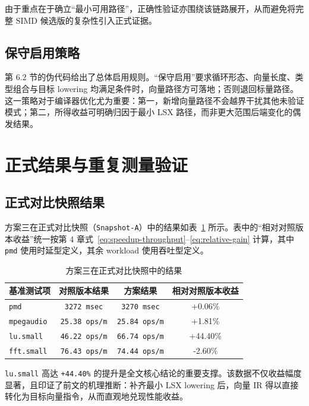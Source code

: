 由于重点在于确立“最小可用路径”，正确性验证亦围绕该链路展开，从而避免将完整 SIMD 候选版的复杂性引入正式证据。

\subsection{保守启用策略}

第 6.2 节的伪代码给出了总体启用规则。“保守启用”要求循环形态、向量长度、类型组合与目标 lowering 均满足条件时，向量路径方可落地；否则退回标量路径。这一策略对于编译器优化尤为重要：第一，新增向量路径不会越界干扰其他未验证模式；第二，所得收益可明确归因于最小 LSX 路径，而非更大范围后端变化的偶发结果。

\section{正式结果与重复测量验证}

\subsection{正式对比快照结果}

方案三在正式对比快照（\texttt{Snapshot-A}）中的结果如表~\ref{tab:scheme3-result} 所示。表中的“相对对照版本收益”统一按第 4 章式~\ref{eq:speedup-throughput}--\ref{eq:relative-gain} 计算，其中 \texttt{pmd} 使用时延型定义，其余 workload 使用吞吐型定义。

\begin{table}[htbp]
    \centering
    \small
    \caption{方案三在正式对比快照中的结果}
    \label{tab:scheme3-result}
    \begin{tabular}{lccc}
        \toprule
        \textbf{基准测试项} & \textbf{对照版本结果} & \textbf{方案结果} & \textbf{相对对照版本收益} \\
        \midrule
        \texttt{pmd} & \texttt{3272\,msec} & \texttt{3270\,msec} & +0.06\% \\
        \texttt{mpegaudio} & \texttt{25.38\,ops/m} & \texttt{25.84\,ops/m} & +1.81\% \\
        \texttt{lu.small} & \texttt{46.22\,ops/m} & \texttt{66.74\,ops/m} & +44.40\% \\
        \texttt{fft.small} & \texttt{76.43\,ops/m} & \texttt{74.44\,ops/m} & -2.60\% \\
        \bottomrule
    \end{tabular}
\end{table}

\texttt{lu.small} 高达 \texttt{+44.40\%} 的提升是全文核心结论的重要支撑。该数据不仅收益幅度显著，且印证了前文的机理推断：补齐最小 LSX lowering 后，向量 IR 得以直接转化为目标向量指令，从而直观地兑现性能收益。

